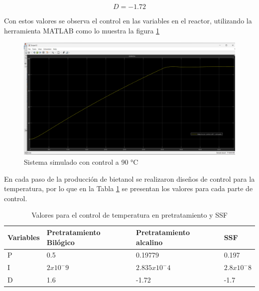 \documentclass[12pt]{article}
\begin{document}
	\begin{equation}
		D=-1.72
	\end{equation}
	
	Con estos valores se observa el control en las variables en el reactor, utilizando la herramienta MATLAB como lo muestra la figura \ref{sistema simulado}
	
	\begin{figure}[H]
		\centering
		\includegraphics[width=0.8\linewidth]{imagenes/sistema_controlado}
		\caption{Sistema simulado con control a 90 °C}
		\label{sistema simulado}
	\end{figure}
	
  En cada paso de la producción de bietanol se realizaron diseños de control para la temperatura, por lo que en la Tabla \ref{tabla_control} se presentan los valores para cada parte de control.
	 
	
	
	\begin{table}[H]
		\centering
		\caption{Valores para el control de temperatura en pretratamiento y SSF}
		\begin{tabular}{|l|l|l|l|}
			\hline
			Variables & Pretratamiento Bilógico & Pretratamiento alcalino & SSF \\ \hline
			P & 0.5 & 0.19779 & 0.197 \\ \hline
	    	I & $2 x10^-9 $ & $2.835 x10^-4 $ & $2.8 x10^-8 $ \\ \hline
			D & 1.6 & -1.72 & -1.7 \\ \hline
\end{tabular}
\label{tabla_control}
\end{table}
	
	
	
	
	
	
\end{document}
